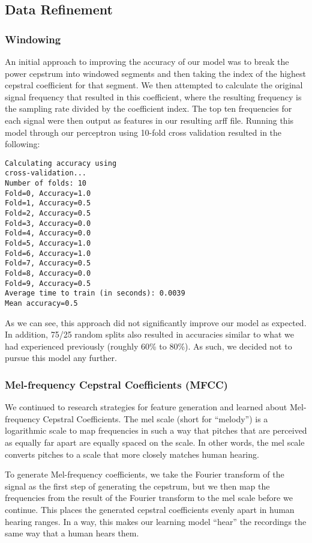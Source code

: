 \documentclass{article}
\begin{document}
\subsection{Data Refinement}

\subsubsection{Windowing}

An initial approach to improving the accuracy of our model was to break the power cepstrum into windowed segments and then taking the index of the highest cepstral coefficient for that segment.  We then attempted to calculate the original signal frequency that resulted in this coefficient, where the resulting frequency is the sampling rate divided by the coefficient index.  The top ten frequencies for each signal were then output as features in our resulting arff file.  Running this model through our perceptron using 10-fold cross validation resulted in the following:

\begin{verbatim}
Calculating accuracy using
cross-validation...
Number of folds: 10
Fold=0, Accuracy=1.0
Fold=1, Accuracy=0.5
Fold=2, Accuracy=0.5
Fold=3, Accuracy=0.0
Fold=4, Accuracy=0.0
Fold=5, Accuracy=1.0
Fold=6, Accuracy=1.0
Fold=7, Accuracy=0.5
Fold=8, Accuracy=0.0
Fold=9, Accuracy=0.5
Average time to train (in seconds): 0.0039
Mean accuracy=0.5
\end{verbatim}

As we can see, this approach did not significantly improve our model as expected.  In addition, 75/25 random splits also resulted in accuracies similar to what we had experienced previously (roughly 60\% to 80\%).  As such, we decided not to pursue this model any further.

\subsubsection{Mel-frequency Cepstral Coefficients (MFCC)}

We continued to research strategies for feature generation and learned about Mel-frequency Cepstral Coefficients. The mel scale (short for “melody”) is a logarithmic scale to map frequencies in such a way that pitches that are perceived as equally far apart are equally spaced on the scale. In other words, the mel scale converts pitches to a scale that more closely matches human hearing.

To generate Mel-frequency coefficients, we take the Fourier transform of the signal as the first step of generating the cepstrum, but we then map the frequencies from the result of the Fourier transform to the mel scale before we continue. This places the generated cepstral coefficients evenly apart in human hearing ranges. In a way, this makes our learning model “hear” the recordings the same way that a human hears them.
\end{document}
